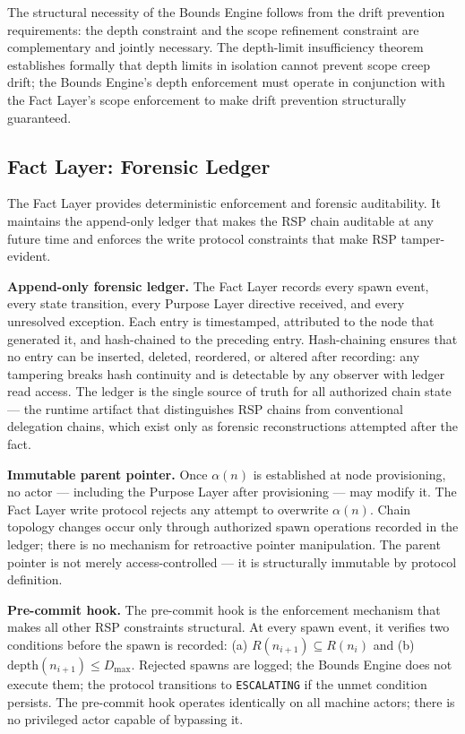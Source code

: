 The structural necessity of the Bounds Engine follows from the drift prevention requirements: the depth constraint and the scope refinement constraint are complementary and jointly necessary. The depth-limit insufficiency theorem establishes formally that depth limits in isolation cannot prevent scope creep drift; the Bounds Engine's depth enforcement must operate in conjunction with the Fact Layer's scope enforcement to make drift prevention structurally guaranteed.

\subsection{Fact Layer: Forensic Ledger}
\label{sec:rs-fact-ledger}

The Fact Layer provides deterministic enforcement and forensic auditability. It maintains the append-only ledger that makes the RSP chain auditable at any future time and enforces the write protocol constraints that make RSP tamper-evident.

\medskip
\noindent\textbf{Append-only forensic ledger.} The Fact Layer records every spawn event, every state transition, every Purpose Layer directive received, and every unresolved exception. Each entry is timestamped, attributed to the node that generated it, and hash-chained to the preceding entry. Hash-chaining ensures that no entry can be inserted, deleted, reordered, or altered after recording: any tampering breaks hash continuity and is detectable by any observer with ledger read access. The ledger is the single source of truth for all authorized chain state --- the runtime artifact that distinguishes RSP chains from conventional delegation chains, which exist only as forensic reconstructions attempted after the fact.

\medskip
\noindent\textbf{Immutable parent pointer.} Once $\alpha(n)$ is established at node provisioning, no actor --- including the Purpose Layer after provisioning --- may modify it. The Fact Layer write protocol rejects any attempt to overwrite $\alpha(n)$. Chain topology changes occur only through authorized spawn operations recorded in the ledger; there is no mechanism for retroactive pointer manipulation. The parent pointer is not merely access-controlled --- it is structurally immutable by protocol definition.

\medskip
\noindent\textbf{Pre-commit hook.} The pre-commit hook is the enforcement mechanism that makes all other RSP constraints structural. At every spawn event, it verifies two conditions before the spawn is recorded: (a) $R(n_{i+1}) \subseteq R(n_i)$ and (b) $\mathrm{depth}(n_{i+1}) \leq D_{\mathrm{max}}$. Rejected spawns are logged; the Bounds Engine does not execute them; the protocol transitions to \texttt{ESCALATING} if the unmet condition persists. The pre-commit hook operates identically on all machine actors; there is no privileged actor capable of bypassing it.

